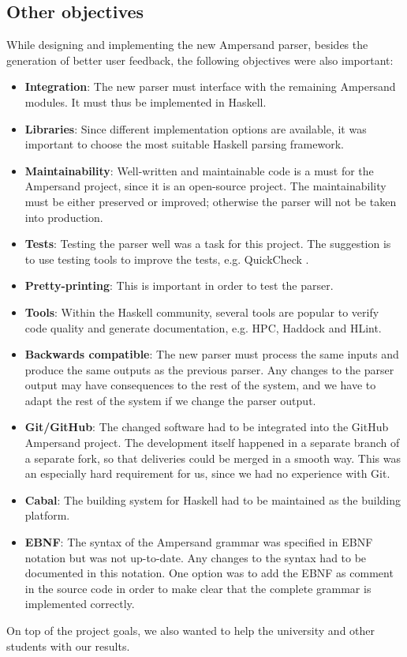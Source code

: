 
\subsection{Other objectives}
While designing and implementing the new Ampersand parser, besides the generation of better user feedback, the following objectives were also important:
\begin{itemize}
  \item \textbf{Integration}: The new parser must interface with the remaining Ampersand modules.
    It must thus be implemented in Haskell.
  \item \textbf{Libraries}: Since different implementation options are available, it was important to choose the most suitable Haskell parsing framework.
  \item \textbf{Maintainability}: Well-written and maintainable code is a must for the Ampersand project, since it is an open-source project.
    The maintainability must be either preserved or improved; otherwise the parser will not be taken into production.
  \item \textbf{Tests}: Testing the parser well was a task for this project.
    The suggestion is to use testing tools to improve the tests, e.g. QuickCheck \cite{project-description}.
  \item \textbf{Pretty-printing}: This is important in order to test the parser.
%
%
%
  \item \textbf{Tools}: Within the Haskell community, several tools are popular to verify code quality and generate documentation, e.g. HPC, Haddock and HLint.
  \item \textbf{Backwards compatible}: The new parser must process the same inputs and produce the same outputs as the previous parser.
    Any changes to the parser output may have consequences to the rest of the system, and we have to adapt the rest of the system if we change the parser output.
  \item \textbf{Git/GitHub}: The changed software had to be integrated into the GitHub Ampersand project.
    The development itself happened in a separate branch of a separate fork, so that deliveries could be merged in a smooth way.
    This was an especially hard requirement for us, since we had no experience with Git.
  \item \textbf{Cabal}: The building system for Haskell had to be maintained as the building platform.
  \item \textbf{EBNF}: The syntax of the Ampersand grammar was specified in EBNF notation but was not up-to-date.
    Any changes to the syntax had to be documented in this notation.
    One option was to add the EBNF as comment in the source code in order to make clear that the complete grammar is implemented correctly.
\end{itemize}

On top of the project goals, we also wanted to help the university and other students with our results.

